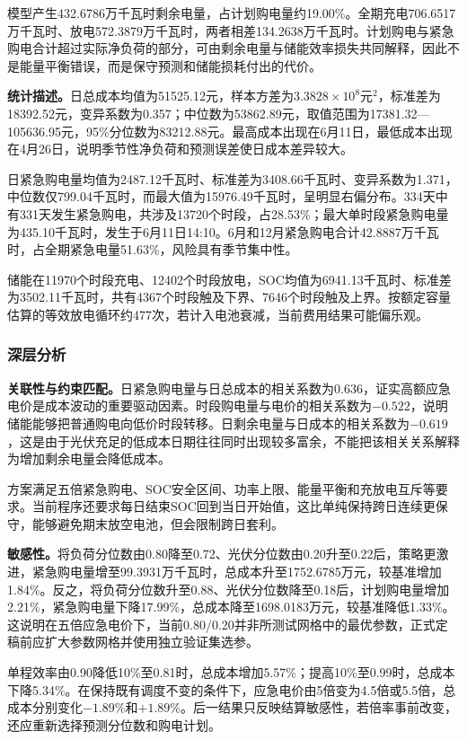 \documentclass[UTF8,a4paper,12pt,fontset=fandol]{ctexart}
\numberwithin{equation}{section}
\begin{document}
模型产生432.6786万千瓦时剩余电量，占计划购电量约19.00\%。全期充电706.6517万千瓦时、放电572.3879万千瓦时，两者相差134.2638万千瓦时。计划购电与紧急购电合计超过实际净负荷的部分，可由剩余电量与储能效率损失共同解释，因此不是能量平衡错误，而是保守预测和储能损耗付出的代价。

\textbf{统计描述。}日总成本均值为51525.12元，样本方差为$3.3828\times10^8$元$^2$，标准差为18392.52元，变异系数为0.357；中位数为53862.89元，取值范围为17381.32---105636.95元，95\%分位数为83212.88元。最高成本出现在6月11日，最低成本出现在4月26日，说明季节性净负荷和预测误差使日成本差异较大。

日紧急购电量均值为2487.12千瓦时、标准差为3408.66千瓦时、变异系数为1.371，中位数仅799.04千瓦时，而最大值为15976.49千瓦时，呈明显右偏分布。334天中有331天发生紧急购电，共涉及13720个时段，占28.53\%；最大单时段紧急购电量为435.10千瓦时，发生于6月11日14:10。6月和12月紧急购电合计42.8887万千瓦时，占全期紧急电量51.63\%，风险具有季节集中性。

储能在11970个时段充电、12402个时段放电，SOC均值为6941.13千瓦时、标准差为3502.11千瓦时，共有4367个时段触及下界、7646个时段触及上界。按额定容量估算的等效放电循环约477次，若计入电池衰减，当前费用结果可能偏乐观。

\subsubsection{深层分析}

\textbf{关联性与约束匹配。}日紧急购电量与日总成本的相关系数为0.636，证实高额应急电价是成本波动的重要驱动因素。时段购电量与电价的相关系数为$-0.522$，说明储能能够把普通购电向低价时段转移。日剩余电量与日成本的相关系数为$-0.619$，这是由于光伏充足的低成本日期往往同时出现较多富余，不能把该相关关系解释为增加剩余电量会降低成本。

方案满足五倍紧急购电、SOC安全区间、功率上限、能量平衡和充放电互斥等要求。当前程序还要求每日结束SOC回到当日开始值，这比单纯保持跨日连续更保守，能够避免期末放空电池，但会限制跨日套利。

\textbf{敏感性。}将负荷分位数由0.80降至0.72、光伏分位数由0.20升至0.22后，策略更激进，紧急购电量增至99.3931万千瓦时，总成本升至1752.6785万元，较基准增加1.84\%。反之，将负荷分位数升至0.88、光伏分位数降至0.18后，计划购电量增加2.21\%，紧急购电量下降17.99\%，总成本降至1698.0183万元，较基准降低1.33\%。这说明在五倍应急电价下，当前0.80/0.20并非所测试网格中的最优参数，正式定稿前应扩大参数网格并使用独立验证集选参。

单程效率由0.90降低10\%至0.81时，总成本增加5.57\%；提高10\%至0.99时，总成本下降5.34\%。在保持既有调度不变的条件下，应急电价由5倍变为4.5倍或5.5倍，总成本分别变化$-1.89\%$和$+1.89\%$。后一结果只反映结算敏感性，若倍率事前改变，还应重新选择预测分位数和购电计划。
\end{document}
